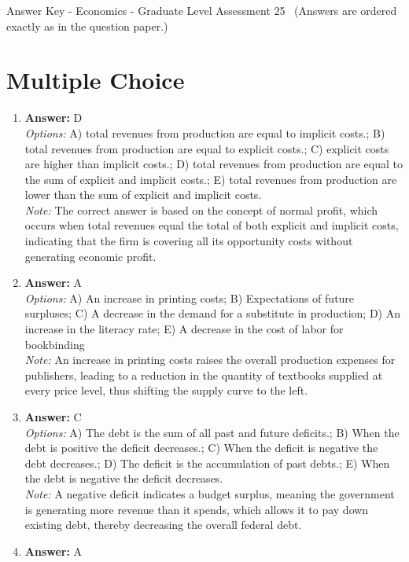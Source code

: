 \documentclass[12pt]{article}
\begin{document}
\begin{center}
Answer Key - Economics - Graduate Level Assessment 25 \
\small (Answers are ordered exactly as in the question paper.)
\end{center}

\section*{Multiple Choice}
\begin{enumerate}[label=\arabic*.]
\item \textbf{Answer:} D
\\ \textit{Options:} A) total revenues from production are equal to implicit costs.; B) total revenues from production are equal to explicit costs.; C) explicit costs are higher than implicit costs.; D) total revenues from production are equal to the sum of explicit and implicit costs.; E) total revenues from production are lower than the sum of explicit and implicit costs.
\\ \textit{Note:} The correct answer is based on the concept of normal profit, which occurs when total revenues equal the total of both explicit and implicit costs, indicating that the firm is covering all its opportunity costs without generating economic profit.
\item \textbf{Answer:} A
\\ \textit{Options:} A) An increase in printing costs; B) Expectations of future surpluses; C) A decrease in the demand for a substitute in production; D) An increase in the literacy rate; E) A decrease in the cost of labor for bookbinding
\\ \textit{Note:} An increase in printing costs raises the overall production expenses for publishers, leading to a reduction in the quantity of textbooks supplied at every price level, thus shifting the supply curve to the left.
\item \textbf{Answer:} C
\\ \textit{Options:} A) The debt is the sum of all past and future deficits.; B) When the debt is positive the deficit decreases.; C) When the deficit is negative the debt decreases.; D) The deficit is the accumulation of past debts.; E) When the debt is negative the deficit decreases.
\\ \textit{Note:} A negative deficit indicates a budget surplus, meaning the government is generating more revenue than it spends, which allows it to pay down existing debt, thereby decreasing the overall federal debt.
\item \textbf{Answer:} A

\end{enumerate}
\end{document}
